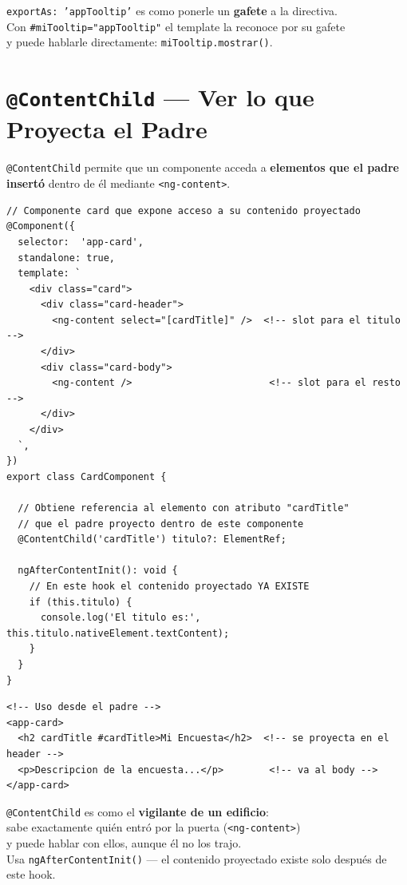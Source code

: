 \documentclass[12pt, a4paper]{article}
\begin{document}
\begin{tcolorbox}[analogia, title={\emoji{name-badge} \emoji{handshake} El Nombre en la Gafete}]
  \texttt{exportAs: 'appTooltip'} es como ponerle un \textbf{gafete} a la directiva.\\[0.3cm]
  Con \texttt{\#miTooltip="appTooltip"} el template la reconoce por su gafete\\
  y puede hablarle directamente: \texttt{miTooltip.mostrar()}.
\end{tcolorbox}

\section{  \texttt{@ContentChild} --- Ver lo que Proyecta el Padre}

\texttt{@ContentChild} permite que un componente acceda a \textbf{elementos que el padre insertó}
dentro de él mediante \texttt{<ng-content>}.

\begin{lstlisting}
// Componente card que expone acceso a su contenido proyectado
@Component({
  selector:  'app-card',
  standalone: true,
  template: `
    <div class="card">
      <div class="card-header">
        <ng-content select="[cardTitle]" />  <!-- slot para el titulo -->
      </div>
      <div class="card-body">
        <ng-content />                        <!-- slot para el resto -->
      </div>
    </div>
  `,
})
export class CardComponent {

  // Obtiene referencia al elemento con atributo "cardTitle"
  // que el padre proyecto dentro de este componente
  @ContentChild('cardTitle') titulo?: ElementRef;

  ngAfterContentInit(): void {
    // En este hook el contenido proyectado YA EXISTE
    if (this.titulo) {
      console.log('El titulo es:', this.titulo.nativeElement.textContent);
    }
  }
}
\end{lstlisting}

\begin{lstlisting}
<!-- Uso desde el padre -->
<app-card>
  <h2 cardTitle #cardTitle>Mi Encuesta</h2>  <!-- se proyecta en el header -->
  <p>Descripcion de la encuesta...</p>        <!-- va al body -->
</app-card>
\end{lstlisting}

\begin{tcolorbox}[analogia, title={\emoji{children-crossing} \emoji{eyes} El Vigilante de Entrada}]
  \texttt{@ContentChild} es como el \textbf{vigilante de un edificio}:\\
  sabe exactamente quién entró por la puerta (\texttt{<ng-content>})\\
  y puede hablar con ellos, aunque él no los trajo.\\[0.3cm]
   Usa \texttt{ngAfterContentInit()} — el contenido proyectado existe solo después de este hook.
\end{tcolorbox}
\end{document}
